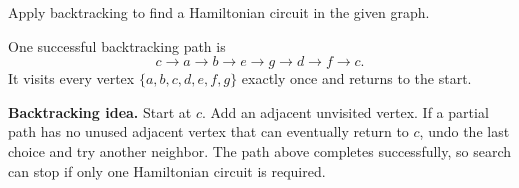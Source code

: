 \documentclass[11pt,a4paper]{article}
\begin{document}
\begin{qaquestion}
Apply backtracking to find a Hamiltonian circuit in the given graph.
\end{qaquestion}
\begin{qaanswer}[Answer 2(c)]
One successful backtracking path is
\[
\boxed{c\to a\to b\to e\to g\to d\to f\to c}.
\]
It visits every vertex \(\{a,b,c,d,e,f,g\}\) exactly once and returns to the start.

\begin{center}
\end{center}

\textbf{Backtracking idea.} Start at \(c\). Add an adjacent unvisited vertex. If a partial path has no unused adjacent vertex that can eventually return to \(c\), undo the last choice and try another neighbor. The path above completes successfully, so search can stop if only one Hamiltonian circuit is required.
\end{qaanswer}
\end{document}
